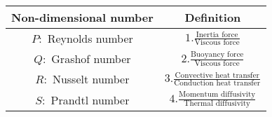 \begin{table}[h!]
    \centering
    \renewcommand{\arraystretch}{1.5} %
    \begin{tabular}{|c|c|}
        \hline
        \textbf{Non-dimensional number} &  \textbf{Definition} \\
        \hline
        $P\colon$  Reynolds number & $1.\frac{\text{Inertia force}}{\text{Viscous force}}$ \\
        \hline
        $Q\colon$ Grashof number & $2.\frac{\text{Buoyancy force}}{\text{Viscous force}}$ \\
        \hline
        $R\colon$ Nusselt number & $3.\frac{\text{Convective heat transfer}}{\text{Conduction heat transfer}}$ \\
        \hline
        $S\colon$ Prandtl number & $4.\frac{\text{Momentum diffusivity}}{\text{Thermal diffusivity}}$ \\
        \hline
    \end{tabular}
\end{table}
